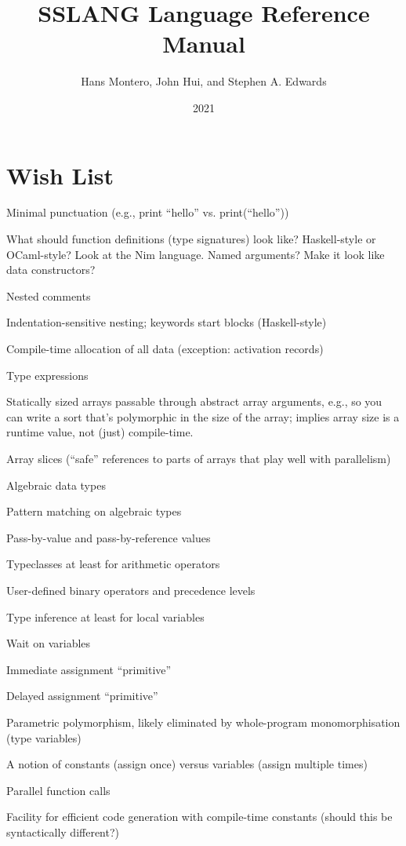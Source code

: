 \documentclass{article}
\title{SSLANG Language Reference Manual}
\author{Hans Montero, John Hui, and Stephen A. Edwards}
\date{2021}
\begin{document}
\maketitle

\section{Wish List}

Minimal punctuation (e.g., print ``hello'' vs. print(``hello''))

What should function definitions (type signatures) look like?  Haskell-style or OCaml-style?  Look at the Nim language.  Named arguments?  Make it look like data constructors?

Nested comments

Indentation-sensitive nesting; keywords start blocks (Haskell-style)

Compile-time allocation of all data (exception: activation records)

Type expressions

Statically sized arrays passable through abstract array arguments, e.g., so you can write a sort that's polymorphic in the size of the array; implies array size is a runtime value, not (just) compile-time.

Array slices (``safe'' references to parts of arrays that play well with
parallelism)

Algebraic data types

Pattern matching on algebraic types

Pass-by-value and pass-by-reference values

Typeclasses at least for arithmetic operators

User-defined binary operators and precedence levels

Type inference at least for local variables

Wait on variables

Immediate assignment ``primitive''

Delayed assignment ``primitive''

Parametric polymorphism, likely eliminated by whole-program monomorphisation (type variables)

A notion of constants (assign once) versus variables (assign multiple times)

Parallel function calls

Facility for efficient code generation with compile-time constants (should this be syntactically different?)
\end{document}
